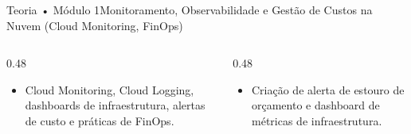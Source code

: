 \begin{senaiframe}{Teoria • Módulo 1}{Monitoramento, Observabilidade e Gestão de Custos na Nuvem (Cloud Monitoring, FinOps)}
  \begin{columns}[t]
    \begin{column}{0.48\textwidth}
      \begin{tcolorbox}[senaibluecard, title={Fundamentos Teóricos}]
        \begin{itemize}
          \item Cloud Monitoring, Cloud Logging, dashboards de infraestrutura, alertas de custo e práticas de FinOps.
        \end{itemize}
      \end{tcolorbox}
    \end{column}
    \begin{column}{0.48\textwidth}
      \begin{tcolorbox}[senaigreencard, title={Prática \& Laboratório}]
        \begin{itemize}
          \item Criação de alerta de estouro de orçamento e dashboard de métricas de infraestrutura.
        \end{itemize}
      \end{tcolorbox}
    \end{column}
  \end{columns}
\end{senaiframe}
